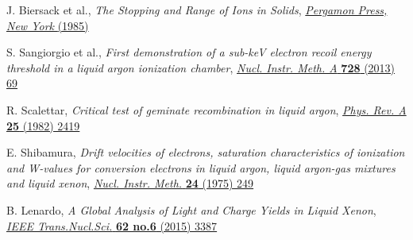\documentclass[a4paper,11pt]{article}
\begin{document}
\begin{thebibliography}{99}
J. Biersack et al., \emph{The Stopping and Range of Ions in Solids}, \href{}{\emph{Pergamon Press, New York} {\bf } (1985) }



S. Sangiorgio et al., \emph{First demonstration of a sub-keV electron recoil energy threshold in a liquid argon ionization chamber}, \href{http://doi.org/10.1016/j.nima.2013.06.061}{\emph{Nucl. Instr. Meth. A} {\bf 728} (2013) 69}

R. Scalettar, \emph{Critical test of geminate recombination in liquid argon}, \href{https://doi.org/10.1103/PhysRevA.25.2419}{\emph{Phys. Rev. A} {\bf 25} (1982) 2419}

E. Shibamura, \emph{Drift velocities of electrons, saturation characteristics of ionization and W-values for conversion electrons in liquid argon, liquid argon-gas mixtures and liquid xenon}, \href{https://doi.org/10.1016/0029-554X(75)90327-4}{\emph{Nucl. Instr. Meth.} {\bf 24} (1975) 249}

B. Lenardo, \emph{A Global Analysis of Light and Charge Yields in Liquid Xenon}, \href{10.1109/TNS.2015.2481322}{\emph{IEEE Trans.Nucl.Sci.} {\bf 62 no.6} (2015) 3387}







\end{thebibliography}
\end{document}
